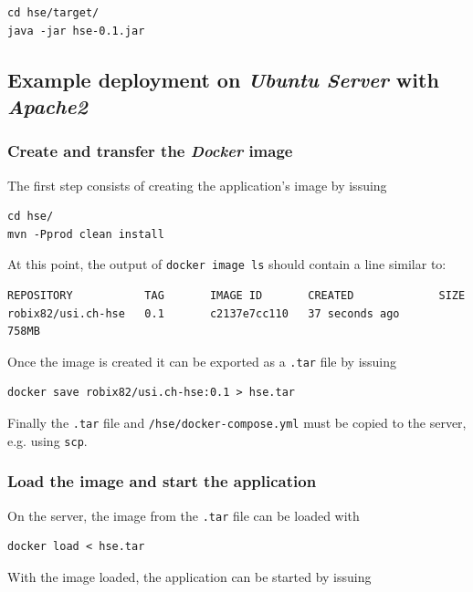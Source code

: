 \documentclass[fleqn]{article}
\begin{document}
\begin{verbatim}
cd hse/target/
java -jar hse-0.1.jar
\end{verbatim}

\subsection{Example deployment on \emph{Ubuntu Server} with \emph{Apache2}}

\subsubsection{Create and transfer the \emph{Docker} image}

The first step consists of creating the application's image by issuing

\begin{verbatim}
cd hse/
mvn -Pprod clean install
\end{verbatim}

At this point, the output of \texttt{docker image ls} should contain a line similar to:

\begin{verbatim}
REPOSITORY           TAG       IMAGE ID       CREATED             SIZE
robix82/usi.ch-hse   0.1       c2137e7cc110   37 seconds ago      758MB
\end{verbatim}

Once the image is created it can be exported as a \texttt{.tar} file by issuing

\begin{verbatim}
docker save robix82/usi.ch-hse:0.1 > hse.tar
\end{verbatim}

Finally the \texttt{.tar} file and \texttt{/hse/docker-compose.yml} must be copied to the server, e.g. using \texttt{scp}.

\subsubsection{Load the image and start the application}

On the server, the image from the \texttt{.tar} file can be loaded with

\begin{verbatim}
docker load < hse.tar
\end{verbatim}

With the image loaded, the application can be started by issuing
\end{document}
